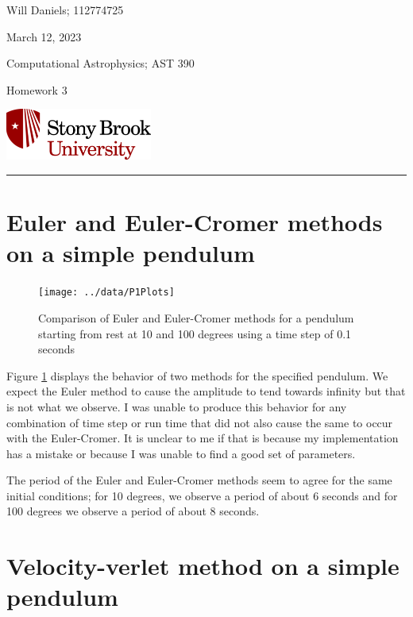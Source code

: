 \documentclass[12pt, letterpaper]{article}
\begin{document}
\noindent
\begin{minipage}{0.5\textwidth}
    Will Daniels; 112774725

    March 12, 2023

    Computational Astrophysics; AST 390

    Homework 3
\end{minipage}
%
\begin{minipage}{0.5\textwidth}
    \begin{flushright}
        \includegraphics[height = 48pt]{../../LatexAssets/SBULogoStacked}
    \end{flushright}
\end{minipage}
\noindent
\rule{\textwidth}{1pt}

\tableofcontents

\section{Euler and Euler-Cromer methods on a simple pendulum}

\begin{figure}[!b]
  \centering
  \caption{Comparison of Euler and Euler-Cromer methods for a pendulum starting
    from rest at 10 and 100 degrees using a time step of 0.1 seconds}
  \label{fig:pend}
  \texttt{[image: ../data/P1Plots]}
\end{figure}

Figure \ref{fig:pend} displays the behavior of two methods for the specified
pendulum. We expect the Euler method to cause the amplitude  to tend towards
infinity but that is not what we observe. I was unable to produce this behavior
for any combination of time step or run time that did not also cause the same to
occur with the Euler-Cromer. It is unclear to me if that is because my
implementation has a mistake or because I was unable to find a good set of
parameters.

The period of the Euler and Euler-Cromer methods seem to agree for the same
initial conditions; for 10 degrees, we observe a period of about 6 seconds and
for 100 degrees we observe a period of about 8 seconds.

\section{Velocity-verlet method on a simple pendulum}
\end{document}
